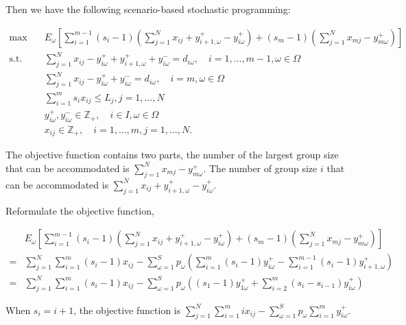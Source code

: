 Then we have the following scenario-based stochastic programming:

\begin{equation}\label{sto_form}
    \begin{aligned}
    \max \quad & E_{\omega}\left[\sum_{i=1}^{m-1} (s_i-1) (\sum_{j= 1}^{N} x_{ij} + y_{i+1,\omega}^{+} - y_{i \omega}^{+}) + (s_m-1) (\sum_{j= 1}^{N} x_{mj} - y_{m \omega}^{+})\right] \\
    \text {s.t.} \quad & \sum_{j= 1}^{N} x_{ij}-y_{i \omega}^{+}+
    y_{i+1, \omega}^{+} + y_{i \omega}^{-}=d_{i \omega}, \quad i =1,\ldots,m-1, \omega \in \Omega \\
    & \sum_{j= 1}^{N} x_{ij} -y_{i \omega}^{+}+y_{i \omega}^{-}=d_{i \omega}, \quad i = m, \omega \in \Omega \\
    & \sum_{i=1}^{m} s_{i} x_{ij} \leq L_j, j =1,\ldots, N\\
    & y_{i \omega}^{+}, y_{i \omega}^{-} \in \mathbb{Z}_{+}, \quad i \in I, \omega \in \Omega \\
    & x_{ij} \in \mathbb{Z}_{+}, \quad i=1,\ldots,m, j =1,\ldots,N.
    \end{aligned}
  \end{equation}

The objective function contains two parts, the number of the largest group size that can be accommodated is $\sum_{j= 1}^{N} x_{mj} - y_{m \omega}^{+}$. The number of group size $i$ that can be accommodated is $\sum_{j= 1}^{N} x_{ij} + y_{i+1,\omega}^{+} - y_{i \omega}^{+}$.

Reformulate the objective function,

\begin{align*}
  & E_{\omega}\left[\sum_{i=1}^{m-1} (s_i-1) (\sum_{j= 1}^{N} x_{ij} + y_{i+1,\omega}^{+} - y_{i \omega}^{+}) + (s_m-1) (\sum_{j= 1}^{N} x_{mj} - y_{m \omega}^{+})\right] \\
  =& \sum_{j =1}^{N} \sum_{i=1}^m (s_i-1) x_{ij} - \sum_{\omega =1}^{S} p_{\omega} \left(\sum_{i=1}^{m}(s_i-1)y_{i \omega}^{+} - \sum_{i=1}^{m-1}(s_i-1)y_{i+1, \omega}^{+}\right) \\
  =& \sum_{j =1}^{N} \sum_{i=1}^m (s_i-1) x_{ij} - \sum_{\omega =1}^{S} p_{\omega} \left((s_1-1)y_{1 \omega}^{+} + \sum_{i=2}^{m}(s_{i}-s_{i-1}) y_{i \omega}^{+} \right)
\end{align*}

When $s_i = i+1$, the objective function is $\sum_{j =1}^{N} \sum_{i=1}^m i x_{ij} - \sum_{\omega =1}^{S} p_{\omega} \sum_{i=1}^{m} y_{i \omega}^{+}$.

